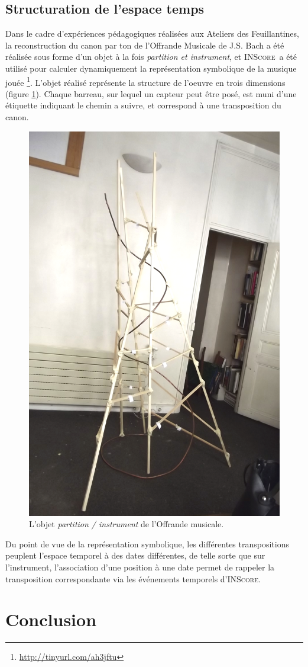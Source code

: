 \documentclass{article}
\newcommand{\inscore}		{\textsc{\small INScore}}
\begin{document}
\subsection{Structuration de l'espace temps}
Dans le cadre d'expériences pédagogiques réalisées aux Ateliers des Feuillantines, la reconstruction du canon par ton de l'Offrande Musicale de J.S. Bach a été réalisée sous forme d'un objet à la fois \emph{partition et instrument}, et \inscore\ a été utilisé pour calculer dynamiquement la représentation symbolique de la musique jouée \footnote{{\scriptsize \url{http://tinyurl.com/ah3jftu}}}. 
L'objet réalisé représente la structure de l'oeuvre en trois dimensions (figure \ref{fig:offr}). Chaque barreau, sur lequel un capteur peut être posé, est muni d'une étiquette indiquant le chemin a suivre, et correspond à une transposition du canon.

\begin{figure}[htbp]
\centerline{
	\includegraphics[width=0.5\columnwidth]{imgs/offrande}}
\caption{L'objet \emph{partition / instrument} de l'Offrande musicale.}
\label{fig:offr}
\end{figure}

Du point de vue de la représentation symbolique, les différentes transpositions peuplent l'espace temporel à des dates différentes, de telle sorte que sur l'instrument, l'association d'une position à une date permet de rappeler la transposition correspondante via les événements temporels d'\inscore.


\section{Conclusion}\label{sec:conclusion}
\end{document}
